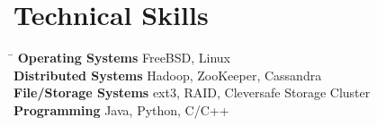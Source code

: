\documentclass[10pt]{article} %
\begin{document}

\section{Technical Skills}

\begin{tabbing}
\hspace{4cm} \= \kill
\textbf{Operating Systems} \> FreeBSD, Linux \\
\textbf{Distributed Systems} \> Hadoop, ZooKeeper, Cassandra \\
\textbf{File/Storage Systems} \> ext3, RAID, Cleversafe Storage Cluster\\
\textbf{Programming} \> Java, Python, C/C++
\end{tabbing}
\end{document}
